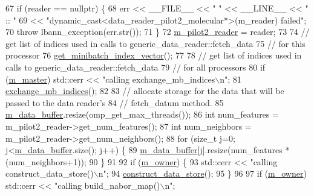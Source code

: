\begin{DoxyCode}
67     \textcolor{keywordflow}{if} (reader == \textcolor{keyword}{nullptr}) \{
68       err << \_\_FILE\_\_ << \textcolor{stringliteral}{" "} << \_\_LINE\_\_ << \textcolor{stringliteral}{" :: "}
69           << \textcolor{stringliteral}{"dynamic\_cast<data\_reader\_pilot2\_molecular*>(m\_reader) failed"};
70       \textcolor{keywordflow}{throw} lbann\_exception(err.str());
71     \}
72     \hyperlink{classlbann_1_1data__store__pilot2__molecular_a1875ae12fe7c2b11818ddb3fecff9f72}{m\_pilot2\_reader} = reader;
73 
74     \textcolor{comment}{// get list of indices used in calls to generic\_data\_reader::fetch\_data }
75     \textcolor{comment}{// for this processor}
76     \hyperlink{classlbann_1_1generic__data__store_ab861db5f81e45a6063b8922a331dd007}{get\_minibatch\_index\_vector}();
77 
78     \textcolor{comment}{// get list of indices used in calls to generic\_data\_reader::fetch\_data }
79     \textcolor{comment}{// for all processors}
80     \textcolor{keywordflow}{if} (\hyperlink{classlbann_1_1generic__data__store_a143fd33ef3a53180bc62745e369c16f8}{m\_master}) std::cerr << \textcolor{stringliteral}{"calling exchange\_mb\_indices\(\backslash\)n"};
81     \hyperlink{classlbann_1_1generic__data__store_aa0ef8d7528f6775d47641ffe5ac229da}{exchange\_mb\_indices}();
82 
83     \textcolor{comment}{// allocate storage for the data that will be passed to the data reader's}
84     \textcolor{comment}{// fetch\_datum method. }
85     \hyperlink{classlbann_1_1data__store__pilot2__molecular_aad14735a82ce4cdcb153fcca94cd2b41}{m\_data\_buffer}.resize(omp\_get\_max\_threads());
86     \textcolor{keywordtype}{int} num\_features = m\_pilot2\_reader->get\_num\_features();
87     \textcolor{keywordtype}{int} num\_neighbors = m\_pilot2\_reader->get\_num\_neighbors();
88     \textcolor{keywordflow}{for} (\textcolor{keywordtype}{size\_t} j=0; j<\hyperlink{classlbann_1_1data__store__pilot2__molecular_aad14735a82ce4cdcb153fcca94cd2b41}{m\_data\_buffer}.size(); j++) \{
89       \hyperlink{classlbann_1_1data__store__pilot2__molecular_aad14735a82ce4cdcb153fcca94cd2b41}{m\_data\_buffer}[j].resize(num\_features * (num\_neighbors+1));
90     \}
91 
92     \textcolor{keywordflow}{if} (\hyperlink{classlbann_1_1data__store__pilot2__molecular_a9229deea455ef0a68508e6b956887dd3}{m\_owner}) \{
93       std::cerr << \textcolor{stringliteral}{"calling construct\_data\_store()\(\backslash\)n"};
94       \hyperlink{classlbann_1_1data__store__pilot2__molecular_a8021fa0a93e39c9d43de6ecc2d72e14e}{construct\_data\_store}();
95     \}
96 
97     \textcolor{keywordflow}{if} (\hyperlink{classlbann_1_1data__store__pilot2__molecular_a9229deea455ef0a68508e6b956887dd3}{m\_owner}) std::cerr << \textcolor{stringliteral}{"calling build\_nabor\_map()\(\backslash\)n"};

\end{DoxyCode}
